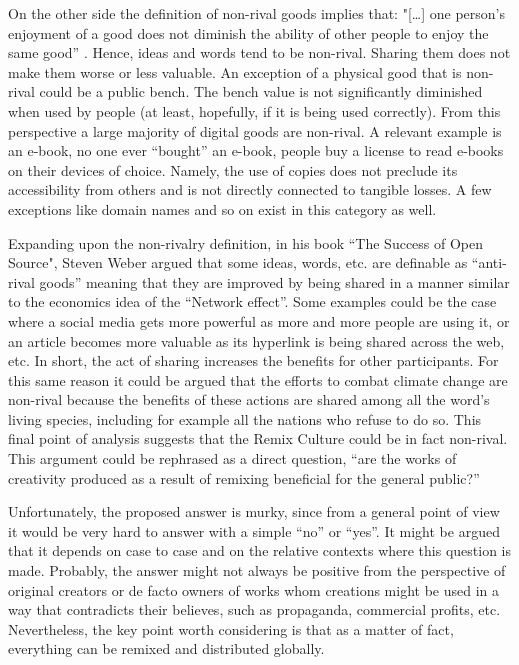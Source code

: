 On the other side the definition of non-rival goods implies that: "[…] one person’s enjoyment of a good does not diminish the ability of other people to enjoy the same good” . Hence, ideas and words tend to be non-rival. Sharing them does not make them worse or less valuable. An exception of a physical good that is non-rival could be a public bench. The bench value is not significantly diminished when used by people (at least, hopefully, if it is being used correctly). From this perspective a large majority of digital goods are non-rival. A relevant example is an e-book, no one ever “bought” an e-book, people buy a license to read e-books on their devices of choice. Namely, the use of copies does not preclude its accessibility from others and is not directly connected to tangible losses. A few exceptions like domain names and so on exist in this category as well.

Expanding upon the non-rivalry definition, in his book “The Success of Open Source", Steven Weber argued that some ideas, words, etc. are definable as “anti-rival goods” meaning that they are improved by being shared in a manner similar to the economics idea of the “Network effect”. Some examples could be the case where a social media gets more powerful as more and more people are using it, or an article becomes more valuable as its hyperlink is being shared across the web, etc. In short, the act of sharing increases the benefits for other participants. For this same reason it could be argued that the efforts to combat climate change are non-rival because the benefits of these actions are shared among all the word’s living species, including for example all the nations who refuse to do so. 
This final point of analysis suggests that the Remix Culture could be in fact non-rival. This argument could be rephrased as a direct question, “are the works of creativity produced as a result of remixing beneficial for the general public?”

Unfortunately, the proposed answer is murky, since from a general point of view it would be very hard to answer with a simple “no” or “yes”. It might be argued that it depends on case to case and on the relative contexts where this question is made. Probably, the answer might not always be positive from the perspective of original creators or de facto owners of works whom creations might be used in a way that contradicts their believes, such as propaganda, commercial profits, etc. Nevertheless, the key point worth considering is that as a matter of fact, everything can be remixed and distributed globally.

